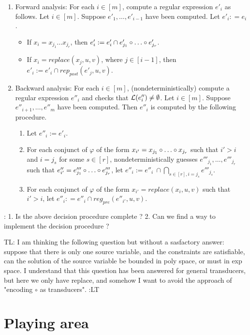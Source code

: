 \documentclass{llncs}
\newcommand{\tl}[1]{\color{blue} {TL: #1 :LT} \color{black}}
\begin{document}
{\begin{enumerate}
\item Forward analysis: For each $i \in [m]$, compute a regular expression $e'_i$ as follows. Let $i \in [m]$. Suppose $e'_1, \dots, e'_{i-1}$ have been computed. Let $e'_i : = e_i$.
\begin{itemize}
\item If $x_i = x_{j_1} \dots x_{j_r}$, then $e'_i := e'_i \cap e'_{j_1} \concat \dots \concat e'_{j_r}$.
%
\item If $x_i = replace(x_j, u, v)$, where $j \in [i-1]$, then $e'_i := e'_i \cap  rep_{post}(e'_j, u, v)$.
\end{itemize}
%
\item Backward analysis: For each $i \in [m]$, (nondeterministically) compute a regular expression $e''_i$ and checks that $\mathcal{L}(e''_i) \neq \emptyset$. 
Let $i \in [m]$. Suppose $e''_{i+1}, \dots, e''_{m}$ have been computed.  Then $e''_i$ is computed by the following procedure.
\begin{enumerate}
\item Let $e''_i := e'_i$.  
%
\item For each conjunct of $\varphi$ of the form $x_{i'} = x_{j_1} \concat \dots \concat x_{j_r}$ such that $i' > i$ and $i = j_s$ for some $s \in [r]$, nondeterministically guesses $e'''_{j_1},\dots, e'''_{j_r}$ such that $e''_{i'} = e'''_{j_1} \concat \dots \concat e'''_{j_r}$, let $e''_i := e''_i\ \cap \bigcap \limits_{s \in [r], i = j_s} e'''_{j_s}$.
%
\item For each conjunct of $\varphi$ of the form $x_{i'} = replace(x_i, u, v)$ such that $i' > i$, let $e''_i: = e''_i \cap reg_{pre}(e''_{i'}, u, v)$. 
\end{enumerate}
\end{enumerate}

: 1. Is the above decision procedure complete ?  2. Can we find a way to implement the decision procedure ?

\tl{I am thinking the following question but without a sasfactory answer: suppose that there is only one source variable, and the constraints are satisfiable, can the solution of the source variable be bounded in poly space, or must in exp space. I understand that this question has been answered \cite{LB16} for general transducers, but here we only have replace, and somehow I want to avoid the approach of "encoding $\circ$ as transducers".}  

\section{Playing area}

}
\end{document}
